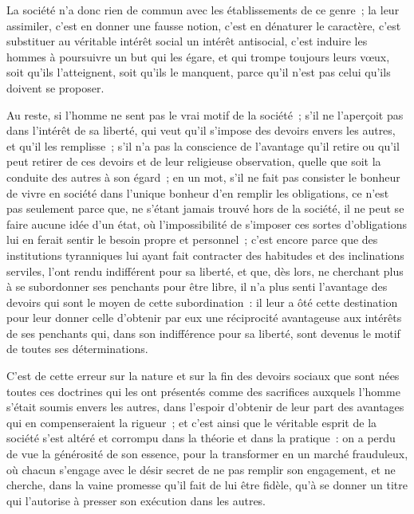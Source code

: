 \documentclass[french,twoside]{book} %
\begin{document}
La société n’a donc rien de commun avec les établissements de ce genre ; la leur assimiler, c’est en donner une fausse notion, c’est en dénaturer le caractère, c’est substituer au véritable intérêt social un intérêt antisocial, c’est induire les hommes à poursuivre un but qui les égare, et qui trompe toujours leurs vœux, soit qu’ils l’atteignent, soit qu’ils le manquent, parce qu’il n’est pas celui qu’ils doivent se proposer.\par
Au reste, si l’homme ne sent pas le vrai motif de la société ; s’il ne l’aperçoit pas dans l’intérêt de sa liberté, qui veut qu’il s’impose des devoirs envers les autres, et qu’il les remplisse ; s’il n’a pas la conscience de l’avantage qu’il retire ou qu’il peut retirer de ces devoirs et de leur religieuse observation, quelle que soit la conduite des autres à son égard ; en un mot, s’il ne fait pas consister le bonheur de vivre en société dans l’unique bonheur d’en remplir les obligations, ce n’est pas seulement parce que, ne s’étant jamais trouvé hors de la société, il ne peut se faire aucune idée d’un état, où l’impossibilité de s’imposer ces sortes d’obligations lui en ferait sentir le besoin propre et personnel ; c’est encore parce que des institutions tyranniques lui ayant fait contracter des habitudes et des inclinations serviles, l’ont rendu indifférent pour sa liberté, et que, dès lors, ne cherchant plus à se subordonner ses penchants pour être libre, il n’a plus senti l’avantage des devoirs qui sont le moyen de cette subordination : il leur a ôté cette destination pour leur donner celle d’obtenir par eux une réciprocité avantageuse aux intérêts de ses penchants qui, dans son indifférence pour sa liberté, sont devenus le motif de toutes ses déterminations.\par
C’est de cette erreur sur la nature et sur la fin des devoirs sociaux que sont nées toutes ces doctrines qui les ont présentés comme des sacrifices auxquels l’homme s’était soumis envers les autres, dans l’espoir d’obtenir de leur part des avantages qui en compenseraient la rigueur ; et c’est ainsi que le véritable esprit de la société s’est altéré et corrompu dans la théorie et dans la pratique : on a perdu de vue la générosité de son essence, pour la transformer en un marché frauduleux, où chacun s’engage avec le désir secret de ne pas remplir son engagement, et ne cherche, dans la vaine promesse qu’il fait de lui être fidèle, qu’à se donner un titre qui l’autorise à presser son exécution dans les autres.\par
\end{document}
